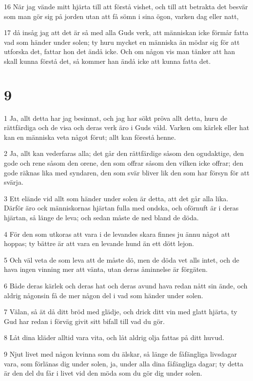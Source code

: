 \par 16 När jag vände mitt hjärta till att förstå vishet, och till att betrakta det besvär som man gör sig på jorden utan att få sömn i sina ögon, varken dag eller natt,
\par 17 då insåg jag att det är så med alla Guds verk, att människan icke förmår fatta vad som händer under solen; ty huru mycket en människa än mödar sig för att utforska det, fattar hon det ändå icke. Och om någon vis man tänker att han skall kunna förstå det, så kommer han ändå icke att kunna fatta det.

\chapter{9}

\par 1 Ja, allt detta har jag besinnat, och jag har sökt pröva allt detta, huru de rättfärdiga och de visa och deras verk äro i Guds våld. Varken om kärlek eller hat kan en människa veta något förut; allt kan förestå henne.
\par 2 Ja, allt kan vederfaras alla; det går den rättfärdige såsom den ogudaktige, den gode och rene såsom den orene, den som offrar såsom den vilken icke offrar; den gode räknas lika med syndaren, den som svär bliver lik den som har försyn för att svärja.
\par 3 Ett elände vid allt som händer under solen är detta, att det går alla lika. Därför äro ock människornas hjärtan fulla med ondska, och oförnuft är i deras hjärtan, så länge de leva; och sedan måste de ned bland de döda.
\par 4 För den som utkoras att vara i de levandes skara finnes ju ännu något att hoppas; ty bättre är att vara en levande hund än ett dött lejon.
\par 5 Och väl veta de som leva att de måste dö, men de döda vet alls intet, och de hava ingen vinning mer att vänta, utan deras åminnelse är förgäten.
\par 6 Både deras kärlek och deras hat och deras avund hava redan nått sin ände, och aldrig någonsin få de mer någon del i vad som händer under solen.
\par 7 Välan, så ät då ditt bröd med glädje, och drick ditt vin med glatt hjärta, ty Gud har redan i förväg givit sitt bifall till vad du gör.
\par 8 Låt dina kläder alltid vara vita, och låt aldrig olja fattas på ditt huvud.
\par 9 Njut livet med någon kvinna som du älskar, så länge de fåfängliga livsdagar vara, som förlänas dig under solen, ja, under alla dina fåfängliga dagar; ty detta är den del du får i livet vid den möda som du gör dig under solen.
